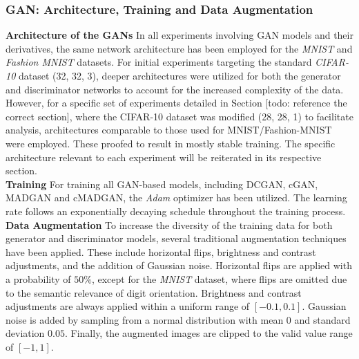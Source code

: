 \subsubsection{GAN: Architecture, Training and Data Augmentation}

\noindent\textbf{Architecture of the GANs}
In all experiments involving GAN models and their derivatives, the same network architecture has been employed for the \textit{MNIST} and \textit{Fashion MNIST} datasets. For initial experiments targeting the standard \textit{CIFAR-10} dataset (32, 32, 3), deeper architectures were utilized for both the generator and discriminator networks to account for the increased complexity of the data. However, for a specific set of experiments detailed in Section [todo: reference the correct section], where the CIFAR-10 dataset was modified (28, 28, 1) to facilitate analysis, architectures comparable to those used for MNIST/Fashion-MNIST were employed. These proofed to result in mostly stable training. The specific architecture relevant to each experiment will be reiterated in its respective section.\\

\noindent\textbf{Training}
For training all GAN-based models, including DCGAN, cGAN, MADGAN and cMADGAN, the \textit{Adam} optimizer has been utilized. The learning rate follows an exponentially decaying schedule throughout the training process.\\

\noindent\textbf{Data Augmentation}\label{body_experiment_dataaugmentation}
To increase the diversity of the training data for both generator and discriminator models, several traditional augmentation techniques have been applied. These include horizontal flips, brightness and contrast adjustments, and the addition of Gaussian noise.
Horizontal flips are applied with a probability of \(50\%\), except for the \textit{MNIST} dataset, where flips are omitted due to the semantic relevance of digit orientation. Brightness and contrast adjustments are always applied within a uniform range of \([-0.1, 0.1]\). Gaussian noise is added by sampling from a normal distribution with mean \(0\) and standard deviation \(0.05\). Finally, the augmented images are clipped to the valid value range of \([-1, 1]\).\\

